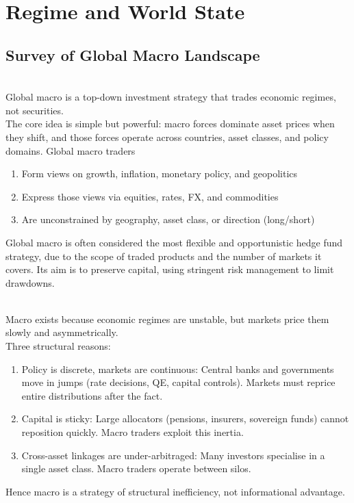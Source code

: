 \section{Regime and World State}

\subsection{Survey of Global Macro Landscape}

\begin{definition} \\
Global macro is a top-down investment strategy that trades economic regimes, not securities.\\
The core idea is simple but powerful: macro forces dominate asset prices when they shift, and those forces operate across countries, asset classes, and policy domains. Global macro traders
\begin{enumerate}[label=\roman*.]
\setlength{\itemsep}{0pt}
\item Form views on growth, inflation, monetary policy, and geopolitics
\item Express those views via equities, rates, FX, and commodities
\item Are unconstrained by geography, asset class, or direction (long/short)
\end{enumerate}
Global macro is often considered the most flexible and opportunistic hedge fund strategy, due to the scope of traded products and the number of markets it covers. Its aim is to preserve capital, using stringent risk management to limit drawdowns.
\end{definition}

\begin{remark} \\
Macro exists because economic regimes are unstable, but markets price them slowly and asymmetrically.\\
Three structural reasons:
\begin{enumerate}[label=\roman*.]
\setlength{\itemsep}{0pt}
\item Policy is discrete, markets are continuous: Central banks and governments move in jumps (rate decisions, QE, capital controls). Markets must reprice entire distributions after the fact.
\item Capital is sticky: Large allocators (pensions, insurers, sovereign funds) cannot reposition quickly. Macro traders exploit this inertia.
\item Cross-asset linkages are under-arbitraged: Many investors specialise in a single asset class. Macro traders operate between silos.
\end{enumerate}
Hence macro is a strategy of structural inefficiency, not informational advantage.
\end{remark}

